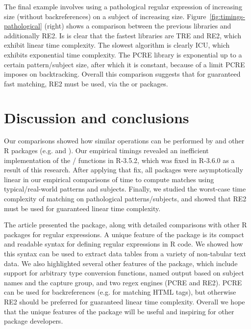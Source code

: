 The final example involves using a pathological regular expression of
increasing size (without backreferences) on a subject of increasing
size. Figure~\ref{fig:timings-pathological} (right) shows a comparison
between the previous libraries and additionally RE2. Is is clear that
the fastest libraries are TRE and RE2, which exhibit linear time
complexity. The slowest algorithm is clearly ICU, which exhibits
exponential time complexity. The PCRE library is exponential up to a
certain pattern/subject size, after which it is constant, because of a
limit PCRE imposes on backtracking. Overall this comparison suggests
that for guaranteed fast matching, RE2 must be used, via the  or
 packages. 

\section{Discussion and conclusions}

Our comparisons showed how similar operations can be performed by
 and other R packages (e.g.  and
). Our empirical timings revealed an inefficient
implementation of the / functions in
R-3.5.2, which was fixed in R-3.6.0 as a result of this
research. After applying that fix, all packages were asymptotically
linear in our empirical comparisons of time to compute matches using
typical/real-world patterns and subjects. Finally, we studied the
worst-case time complexity of matching on pathological
patterns/subjects, and showed that RE2 must be used for guaranteed
linear time complexity.

The article presented the  package, along with
detailed comparisons with other R packages for regular expressions.  A
unique feature of the  package is its compact and
readable syntax for defining regular expressions in R code. We showed
how this syntax can be used to extract data tables from a variety of
non-tabular text data. We also highlighted several other features of
the  package, which include support for 
arbitrary type conversion functions, named output based on subject names and the
 capture group, and two regex engines (PCRE and RE2). PCRE
can be used for backreferences (e.g. for matching HTML tags), but
otherwise RE2 should be preferred for guaranteed linear time
complexity.
Overall we hope that the unique features of the 
package will be useful and inspiring for other package developers.  

